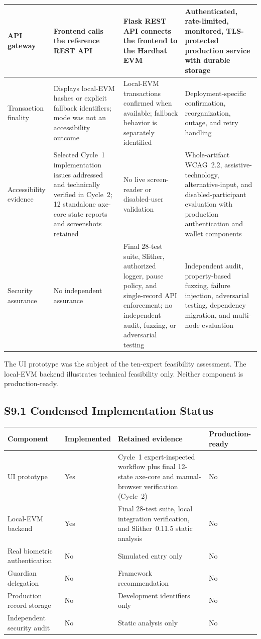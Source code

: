 \documentclass[10pt]{article}
\newcommand{\suppsubsection}[2]{\pdfbookmark[2]{#1}{#2}\subsection*{#1}}
\begin{document}
\begin{center}
\begin{longtable}{|p{2.5cm}|p{4.0cm}|p{4.2cm}|p{4.2cm}|}
API gateway & Frontend calls the reference REST API & Flask REST API connects the frontend to the Hardhat EVM & Authenticated, rate-limited, monitored, TLS-protected production service with durable storage\\\hline
Transaction finality & Displays local-EVM hashes or explicit fallback identifiers; mode was not an accessibility outcome & Local-EVM transactions confirmed when available; fallback behavior is separately identified & Deployment-specific confirmation, reorganization, outage, and retry handling\\\hline
Accessibility evidence & Selected Cycle~1 implementation issues addressed and technically verified in Cycle~2; 12 standalone axe-core state reports and screenshots retained & No live screen-reader or disabled-user validation & Whole-artifact WCAG~2.2, assistive-technology, alternative-input, and disabled-participant evaluation with production authentication and wallet components\\\hline
Security assurance & No independent assurance & Final 28-test suite, Slither, authorized logger, pause policy, and single-record API enforcement; no independent audit, fuzzing, or adversarial testing & Independent audit, property-based fuzzing, failure injection, adversarial testing, dependency migration, and multi-node evaluation\\\hline
\end{longtable}
\end{center}
{\footnotesize The UI prototype was the subject of the ten-expert feasibility assessment. The local-EVM backend illustrates technical feasibility only. Neither component is production-ready.}
\suppsubsection{S9.1 Condensed Implementation Status}{supp-s9-1}
\begin{center}\footnotesize
\begin{tabularx}{\textwidth}{|X|p{2.8cm}|p{4.0cm}|p{2.8cm}|}
\hline
\textbf{Component} & \textbf{Implemented} & \textbf{Retained evidence} & \textbf{Production-ready} \\\hline
UI prototype & Yes & Cycle~1 expert-inspected workflow plus final 12-state axe-core and manual-browser verification (Cycle~2) & No \\\hline
Local-EVM backend & Yes & Final 28-test suite, local integration verification, and Slither~0.11.5 static analysis & No \\\hline
Real biometric authentication & No & Simulated entry only & No \\\hline
Guardian delegation & No & Framework recommendation & No \\\hline
Production record storage & No & Development identifiers only & No \\\hline
Independent security audit & No & Static analysis only & No \\\hline
\end{tabularx}
\end{center}
\end{document}
